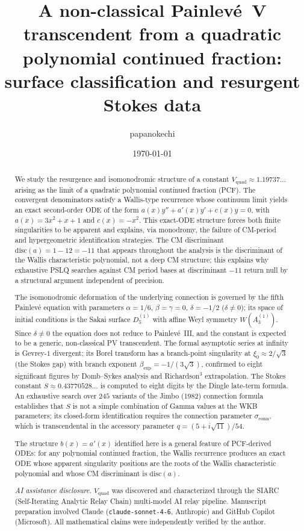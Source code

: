 \documentclass[11pt,a4paper]{article}
\title{A non-classical Painlev\'e~V transcendent
from a quadratic polynomial continued fraction:
surface classification and resurgent Stokes data}
\author{papanokechi}
\date{\today}
\theoremstyle{definition}
\theoremstyle{remark}
\newcommand{\Vq}{V_{\mathrm{quad}}}
\begin{document}
\maketitle

\begin{abstract}
We study the resurgence and isomonodromic
structure of a constant $V_{\mathrm{quad}}
\approx 1.19737\ldots$ arising as the limit
of a quadratic polynomial continued fraction
(PCF). The convergent denominators satisfy a
Wallis-type recurrence whose continuum limit
yields an exact second-order ODE of the form
$a(x)y'' + a'(x)y' + c(x)y = 0$, with
$a(x) = 3x^2+x+1$ and $c(x) = -x^2$. This
exact-ODE structure forces both finite
singularities to be apparent and explains,
via monodromy, the failure of CM-period
and hypergeometric identification strategies.
The CM discriminant $\mathrm{disc}(a)
= 1 - 12 = -11$ that appears throughout
the analysis is the discriminant of the
Wallis characteristic polynomial, not a
deep CM structure; this explains why
exhaustive PSLQ searches against CM
period bases at discriminant $-11$ return
null by a structural argument independent
of precision.

The isomonodromic deformation of the
underlying connection is governed by the
fifth Painlev\'e equation with parameters
$\alpha=1/6$, $\beta=\gamma=0$,
$\delta=-1/2$ ($\delta\neq0$); its space of
initial conditions is the Sakai surface
$D_5^{(1)}$ with affine Weyl symmetry
$W(A_3^{(1)})$. Since $\delta\neq0$ the
equation does not reduce to Painlev\'e~III,
and the constant is expected to be a
generic, non-classical PV transcendent.
The formal asymptotic series at infinity
is Gevrey-$1$ divergent; its Borel
transform has a branch-point singularity
at $\xi_0\approx2/\sqrt{3}$ (the Stokes gap)
with branch exponent
$\beta_{\mathrm{exp}}=-1/(3\sqrt{3})$,
confirmed to eight significant figures
by Domb--Sykes analysis and
Richardson$^3$ extrapolation.
The Stokes constant $S \approx
0.43770528\ldots$ is computed to eight
digits by the Dingle late-term formula.
An exhaustive search over $245$ variants
of the Jimbo (1982) connection formula
establishes that $S$ is not a simple
combination of Gamma values at the WKB
parameters; its closed-form identification
requires the connection parameter
$\sigma_{\mathrm{conn}}$, which is
transcendental in the accessory parameter
$q=(5+i\sqrt{11})/54$.

The structure $b(x)=a'(x)$ identified
here is a general feature of PCF-derived
ODEs: for any polynomial continued
fraction, the Wallis recurrence produces
an exact ODE whose apparent singularity
positions are the roots of the Wallis
characteristic polynomial and whose CM
discriminant is $\mathrm{disc}(a)$.

\smallskip
\noindent\textit{AI assistance disclosure.}
$\Vq$ was discovered and
characterized through the SIARC
(Self-Iterating Analytic Relay Chain)
multi-model AI relay pipeline.
Manuscript preparation involved Claude
(\texttt{claude-sonnet-4-6}, Anthropic)
and GitHub Copilot (Microsoft). All
mathematical claims were independently
verified by the author.
\end{abstract}
\end{document}
